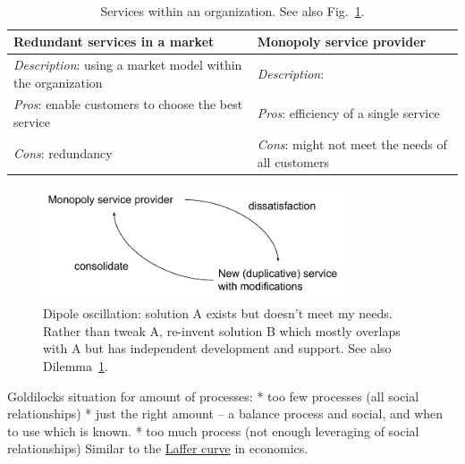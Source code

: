 \ \\

\begin{center}
\begin{table}[ht]
\begin{tabular}{ | m{\dilemmatablewidth}| m{\dilemmatablewidth} | } 
  \hline
  \textbf{Redundant services in a market} &
  \textbf{Monopoly service provider} \\
  \hline
  \textit{Description}: using a market model within the organization &
  \textit{Description}:  \\  
  \hline
  \textit{Pros}: enable customers to choose the best service &
  \textit{Pros}: efficiency of a single service \\
  \hline
  \textit{Cons}: redundancy & 
  \textit{Cons}: might not meet the needs of all customers \\
  \hline
\end{tabular}
\caption{Services within an organization. See also Fig.~\ref{fig:market-vs-monopoly}.
}
\label{table:market-vs-monopoly}
\end{table}
\end{center}


\begin{figure}[ht]
    \centering
    \includegraphics[width=0.8\textwidth]{images/dilemma_market_vs_monopoly.pdf}
    \caption{Dipole oscillation: solution A exists but doesn't meet my needs. Rather than tweak A, re-invent solution B which mostly overlaps with A but has independent development and support. See also Dilemma~\ref{table:market-vs-monopoly}.}
    \label{fig:market-vs-monopoly}
\end{figure}


Goldilocks situation for amount of processes:
* too few processes (all social relationships)
* just the right amount -- a balance process and social, and when to use which is known.
* too much process (not enough leveraging of social relationships)
Similar to the \href{https://en.wikipedia.org/wiki/Laffer_curve}{Laffer curve} in economics.



